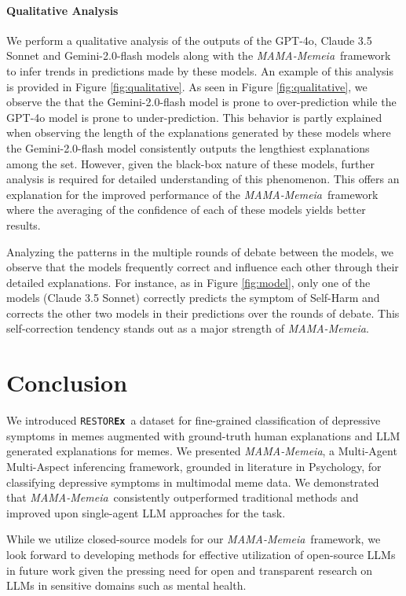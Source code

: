 \documentclass[letterpaper]{article} %
\newcommand{\dataset}{\texttt{RESTOR\textbf{Ex}}}
\newcommand{\model}{\textit{MAMA-Memeia}}
\begin{document}
\paragraph{Qualitative Analysis} We perform a qualitative analysis of the outputs of the GPT-4o, Claude  3.5 Sonnet and Gemini-2.0-flash models along with the \model\ framework to infer trends in predictions made by these models. An example of this analysis is provided in Figure \ref{fig:qualitative}. As seen in Figure \ref{fig:qualitative}, we observe the that the Gemini-2.0-flash model is prone to over-prediction while the GPT-4o model is prone to under-prediction. This behavior is partly explained when observing the length of the explanations generated by these models where the Gemini-2.0-flash model consistently outputs the lengthiest explanations among the set. However, given the black-box nature of these models, further analysis is required for detailed understanding of this phenomenon. This offers an explanation for the improved performance of the \model\ framework where the averaging of the confidence of each of these models yields better results.

Analyzing the patterns in the multiple rounds of debate between the models, we observe that the models frequently correct and influence each other through their detailed explanations. For instance, as in Figure \ref{fig:model}, only one of the models (Claude 3.5 Sonnet) correctly predicts the symptom of Self-Harm and corrects the other two models in their predictions over the rounds of debate. This self-correction tendency stands out as a major strength of \model.


\section{Conclusion}
We introduced \dataset\, a dataset for fine-grained classification of depressive symptoms in memes augmented with ground-truth human explanations and LLM generated explanations for memes. We presented \model, a Multi-Agent Multi-Aspect inferencing framework, grounded in literature in Psychology, for classifying depressive symptoms in multimodal meme data. We demonstrated that \model\ consistently outperformed traditional methods and improved upon single-agent LLM approaches for the task.

While we utilize closed-source models for our \model\ framework, we look forward to developing methods for effective utilization of open-source LLMs in future work given the pressing need for open and transparent research on LLMs in sensitive domains such as mental health.
\end{document}
